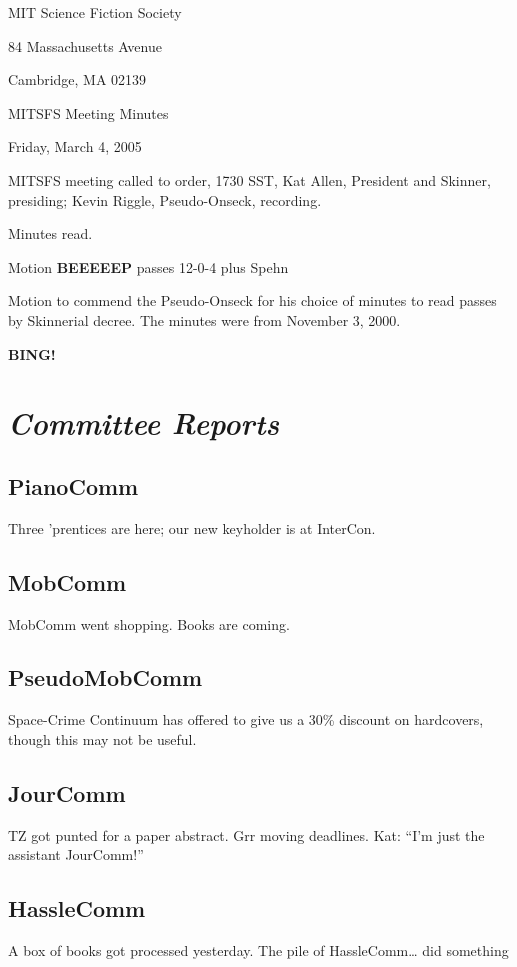 \documentclass[10pt]{article}
\newcommand{\bing}{{\bf BING!} }
\newcommand{\goto}[1]{\bing \vskip 12pt \section*{{\em{#1}}}}
\newcommand{\ps}{ plus Spehn\xspace}
\begin{document}
\begin{center}

MIT Science Fiction Society

84 Massachusetts Avenue

Cambridge, MA 02139

\vspace{12pt}

MITSFS Meeting Minutes

Friday, March 4, 2005

\end{center}

\vspace{18pt}

\setlength{\parskip}{6pt}

\noindent
MITSFS meeting called to order, 1730 SST, Kat Allen, President and
Skinner, presiding; Kevin Riggle, Pseudo-Onseck, recording.

Minutes read.

Motion \textbf{BEEEEEP} passes 12-0-4\ps

Motion to commend the Pseudo-Onseck for his choice of minutes to read passes
by Skinnerial decree.  The minutes were from November 3, 2000.

\goto{Committee Reports}

\subsection*{PianoComm}
Three 'prentices are here; our new keyholder is at InterCon.

\subsection*{MobComm}
MobComm went shopping.  Books are coming. 

\subsection*{PseudoMobComm}
Space-Crime Continuum has offered to give us a 30\% discount on
hardcovers, though this may not be useful.

\subsection*{JourComm}
TZ got punted for a paper abstract.  Grr moving deadlines.  Kat: 
``I'm just the assistant JourComm!''

\subsection*{HassleComm}
 A box of books got processed yesterday.  The pile of HassleComm\dots
 did something
\end{document}
